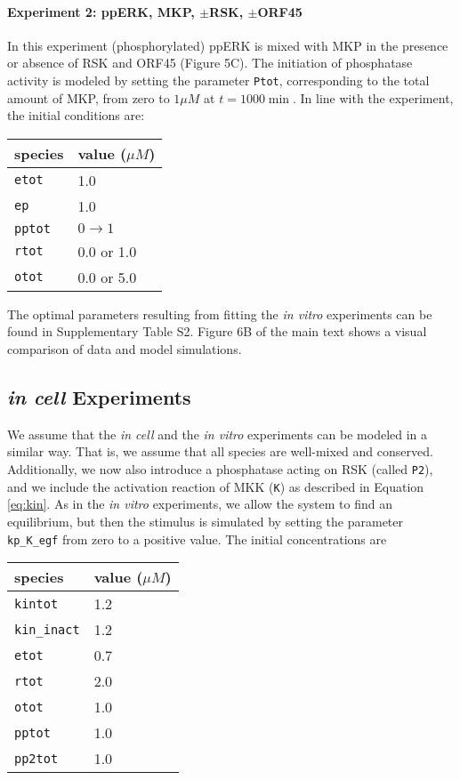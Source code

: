 \documentclass[12pt]{article}
\begin{document}
	\paragraph{Experiment 2: ppERK, MKP, $\pm$RSK, $\pm$ORF45}
	
	In this experiment (phosphorylated) ppERK is mixed with MKP in the
	presence or absence of RSK and ORF45 (Figure 5C). The initiation of
	phosphatase activity is modeled by setting the parameter \texttt{Ptot},
	corresponding to the total amount of MKP, from zero to $1\mu M$ at
	$t=1000\min$. In line with the experiment, the initial conditions
	are: 
	\begin{center}
		\begin{tabular}{ll}
			species  & value ($\mu M$)\\
			\midrule 
			\texttt{etot}  & 1.0\\
			\texttt{ep}  & 1.0\\
			\texttt{pptot}  & $0\rightarrow1$\\
			\texttt{rtot}  & 0.0 or 1.0\\
			\texttt{otot}  & 0.0 or 5.0\\
		\end{tabular}
		\par\end{center}
	
	The optimal parameters resulting from fitting the \emph{in vitro}
	experiments can be found in Supplementary Table S2. Figure 6B of the
	main text shows a visual comparison of data and model simulations.
	
	\subsection{\textit{in cell} Experiments}
	
	\label{ss:incell} We assume that the \textit{in cell} and the \textit{in
		vitro} experiments can be modeled in a similar way. That is, we assume
	that all species are well-mixed and conserved. Additionally, we now
	also introduce a phosphatase acting on RSK (called \texttt{P2}),
	and we include the activation reaction of MKK (\texttt{K}) as described
	in Equation \eqref{eq:kin}. As in the \textit{in vitro} experiments,
	we allow the system to find an equilibrium, but then the stimulus
	is simulated by setting the parameter \texttt{kp\_K\_egf}
	from zero to a positive value. The initial concentrations are 
	\begin{center}
		\begin{tabular}{ll}
			species  & value ($\mu M$)\\
			\midrule 
			\texttt{kintot}  & 1.2\\
			\texttt{kin\_inact}  & 1.2 \\
			\texttt{etot}  & 0.7\\
			\texttt{rtot}  & 2.0\\			
			\texttt{otot}  & 1.0\\
			\texttt{pptot}  & 1.0\\
			\texttt{pp2tot}  & 1.0\\
		\end{tabular}
		\par\end{center}
	
\end{document}
